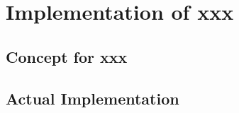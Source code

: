
\chapter{Implementation of xxx}


\section{Concept for xxx}\label{sec:concept-wave}


\section{Actual Implementation}\label{sec:actual-implementation}

